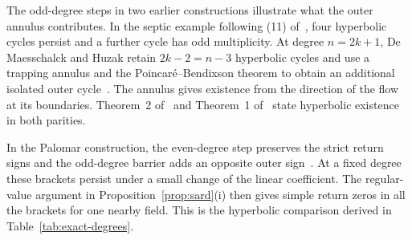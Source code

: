 The odd-degree steps in two earlier constructions illustrate what the
outer annulus contributes. In the septic example following (11)
of~\cite{DMD2011}, four hyperbolic cycles persist and a further cycle
has odd multiplicity. At degree $n=2k+1$, De Maesschalck and Huzak
retain $2k-2=n-3$ hyperbolic cycles and use a trapping annulus and
the Poincar\'e--Bendixson theorem to obtain an additional isolated
outer cycle~\cite[\S3.2]{DMH2015}. The annulus gives existence from the direction
of the flow at its boundaries. Theorem~2 of~\cite{DMD2011} and Theorem~1
of~\cite{DMH2015} state hyperbolic existence in both parities.

In the Palomar construction, the even-degree step preserves the strict
return signs and the odd-degree barrier adds an opposite outer
sign~\cite[proof of Theorem~2]{Palomar2026}. At a fixed degree these
brackets persist under a small change of the linear coefficient.
The regular-value argument in Proposition~\ref{prop:sard}(i) then
gives simple return zeros in all the brackets for one nearby field.
This is the hyperbolic comparison derived in Table~\ref{tab:exact-degrees}.
